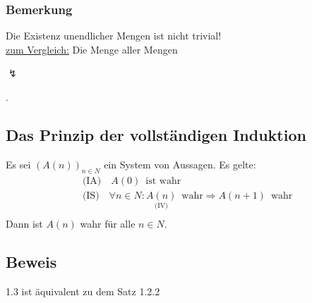 \subsubsection{Bemerkung}
Die Existenz unendlicher Mengen ist nicht trivial! \\
\underline{zum Vergleich:} Die Menge aller Mengen \begin{Large} \( \lightning \) \end{Large}.

\subsection{Das Prinzip der vollständigen Induktion}
Es sei \( (A(n))_{n \in N} \) ein System von Aussagen. Es gelte:
\begin{align*}
&\text{(IA)} \quad A(0) \enspace \text{ist wahr} \\
&\text{(IS)} \quad \forall n \in N : \underset{\text{(IV)}}{A(n)} \enspace \text{wahr} \Longrightarrow A (n+1) \enspace \text{wahr} \\
\end{align*} Dann ist \(A(n)\) wahr für alle \(n \in N \).

\subsection{Beweis} 1.3 ist äquivalent zu dem Satz 1.2.2

